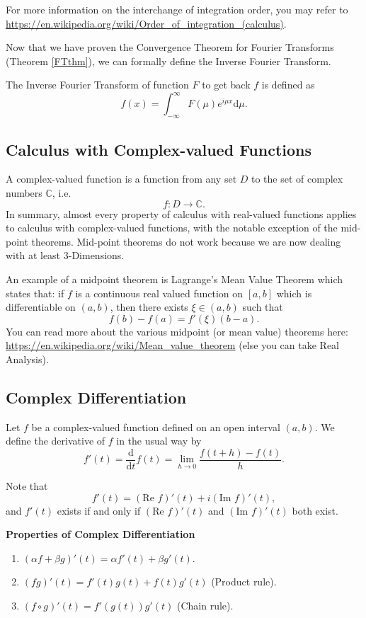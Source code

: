 For more information on the interchange of integration order, you may refer to \url{https://en.wikipedia.org/wiki/Order_of_integration_(calculus)}.

Now that we have proven the Convergence Theorem for Fourier Transforms (Theorem \ref{FTthm}), we can formally define the Inverse Fourier Transform.

\begin{defn}
The Inverse Fourier Transform of function $F$ to get back $f$ is defined as
$$f(x) = \int_{-\infty}^{\infty}F(\mu)e^{i\mu x}\mathrm{d}\mu.$$
\end{defn}

\subsection{Calculus with Complex-valued Functions}
A complex-valued function is a function from any set $D$ to the set of complex numbers $\mathbb{C}$, i.e.
$$f:D\rightarrow\mathbb{C}.$$
In summary, almost every property of calculus with real-valued functions applies to calculus with complex-valued functions, with the notable exception of the mid-point theorems. Mid-point theorems do not work because we are now dealing with at least $3$-Dimensions.

An example of a midpoint theorem is Lagrange's Mean Value Theorem which states that: if $f$ is a continuous real valued function on $[a, b]$ which is
differentiable on $(a, b)$, then there exists $\xi \in (a, b)$ such that
$$f(b) - f(a) = f'(\xi)(b-a).$$
You can read more about the various midpoint (or mean value) theorems here: \url{https://en.wikipedia.org/wiki/Mean_value_theorem} (else you can take Real Analysis).

\subsection{Complex Differentiation}
\begin{defn}
Let $f$ be a complex-valued function defined on an open interval $(a,b)$. We define the
derivative of $f$ in the usual way by
$$f'(t) = \frac{\mathrm{d}}{\mathrm{d}t}f(t) = \lim_{h\rightarrow0}\frac{f(t+h) - f(t)}{h}.$$
\end{defn}
Note that
$$f'(t) = (\mbox{Re } f )'(t)+i (\mbox{Im }f )'(t),$$
and $f'(t)$ exists if and only if $(\mbox{Re }f )'(t)$ and $(\mbox{Im }f )'(t)$ both exist.
\medskip

\textbf{Properties of Complex Differentiation}
\begin{enumerate}
    \item $(\alpha f + \beta g)'(t) = \alpha f' (t) + \beta g' (t)$.
    \item $(fg)'(t) = f' (t) g (t) + f (t) g' (t)$ (Product rule).
    \item $(f \circ g)'(t) = f'(g(t))g'(t)$ (Chain rule).
\end{enumerate}

